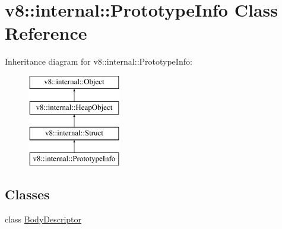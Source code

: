 \hypertarget{classv8_1_1internal_1_1PrototypeInfo}{}\section{v8\+:\+:internal\+:\+:Prototype\+Info Class Reference}
\label{classv8_1_1internal_1_1PrototypeInfo}
Inheritance diagram for v8\+:\+:internal\+:\+:Prototype\+Info\+:\begin{figure}[H]
\begin{center}
\leavevmode
\includegraphics[height=4.000000cm]{classv8_1_1internal_1_1PrototypeInfo}
\end{center}
\end{figure}
\subsection*{Classes}
\begin{DoxyCompactItemize}
\item 
class \mbox{\hyperlink{classv8_1_1internal_1_1PrototypeInfo_1_1BodyDescriptor}{Body\+Descriptor}}
\end{DoxyCompactItemize}
